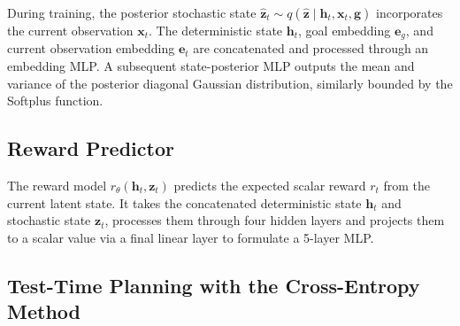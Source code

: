 \documentclass[journal]{IEEEtran}
\begin{document}
During training, the posterior stochastic state $\hat{\bm{z}}_t \sim q(\hat{\bm{z}} \;|\; \bm{h}_t, \bm{x}_t, \bm{g})$ incorporates the current observation $\bm{x}_t$. The deterministic state $\bm{h}_t$, goal embedding $\bm{e}_g$, and current observation embedding $\bm{e}_t$ are concatenated and processed through an embedding MLP. A subsequent state-posterior MLP outputs the mean and variance of the posterior diagonal Gaussian distribution, similarly bounded by the Softplus function.

\subsection{Reward Predictor} The reward model $r_\theta(\bm{h}_t, \bm{z}_t)$ predicts the expected scalar reward $r_t$ from the current latent state. It takes the concatenated deterministic state $\bm{h}_t$ and stochastic state $\bm{z}_t$, processes them through four hidden layers and projects them to a scalar value via a final linear layer to formulate a 5-layer MLP.


\subsection{Test-Time Planning with the Cross-Entropy Method} \label{sec:planning}
\end{document}
